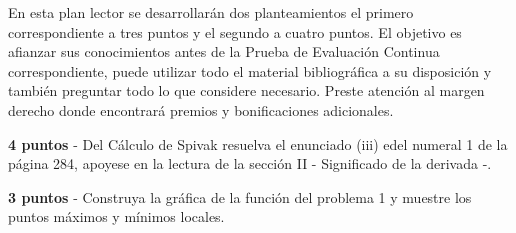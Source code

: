\documentclass[a4 paper]{article}
\begin{document}

En esta plan lector se desarrollarán dos planteamientos el primero correspondiente a tres puntos y el segundo a cuatro puntos. El objetivo es afianzar sus conocimientos antes de la Prueba de Evaluación Continua correspondiente, puede utilizar todo el material bibliográfica a su disposición y también preguntar todo lo que considere necesario. Preste atención al margen derecho donde encontrará premios y bonificaciones adicionales.

\vspace{5mm}

 \textbf{4 puntos} - Del Cálculo de Spivak resuelva el enunciado (iii) edel numeral 1 de la página 284, apoyese en la lectura de la sección II - Significado de la derivada -.
\vskip 3mm
\solution{}
\vspace{30mm}

 \textbf{3 puntos} - Construya la gráfica de la función del problema 1 y muestre los puntos máximos y mínimos locales.
\vskip 3mm
\solution{}
\end{document}
